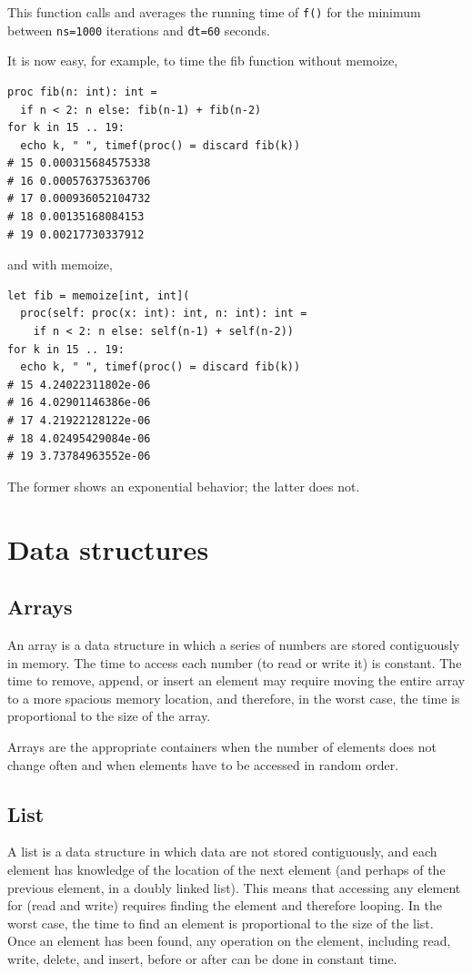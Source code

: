 \documentclass[justified, sixbynine]{tufte-book}
\def\ft{\small\tt}
\theoremstyle{plain}%
\newtheorem * {corollary}{Corollary}
\theoremstyle{definition}
\theoremstyle{remark}
\newtheorem * {remark}{Remark}
\newtheorem * {note}{Note}
\begin{document}
\begin{fullwidth}
This function calls and averages the running time of {\ft f()} for the minimum between {\ft ns=1000} iterations and {\ft dt=60} seconds.

It is now easy, for example, to time the fib function without memoize,
\begin{lstlisting}
proc fib(n: int): int =
  if n < 2: n else: fib(n-1) + fib(n-2)
for k in 15 .. 19:
  echo k, " ", timef(proc() = discard fib(k))
# 15 0.000315684575338
# 16 0.000576375363706
# 17 0.000936052104732
# 18 0.00135168084153
# 19 0.00217730337912
\end{lstlisting}
and with memoize,
\begin{lstlisting}
let fib = memoize[int, int](
  proc(self: proc(x: int): int, n: int): int =
    if n < 2: n else: self(n-1) + self(n-2))
for k in 15 .. 19:
  echo k, " ", timef(proc() = discard fib(k))
# 15 4.24022311802e-06
# 16 4.02901146386e-06
# 17 4.21922128122e-06
# 18 4.02495429084e-06
# 19 3.73784963552e-06
\end{lstlisting}

The former shows an exponential behavior; the latter does not.

\goodbreak\section{Data structures}

\goodbreak\subsection{Arrays}

An array is a data structure in which a series of numbers are stored contiguously in memory. The time to access each number (to read or write it) is constant. The time to remove, append, or insert an element may require moving the entire array to a more spacious memory location, and therefore, in the worst case, the time is proportional to the size of the array.

Arrays are the appropriate containers when the number of elements does not change often and when elements have to be accessed in random order.

\goodbreak\subsection{List}

A list is a data structure in which data are not stored contiguously, and each element has knowledge of the location of the next element (and perhaps of the previous element, in a doubly linked list). This means that accessing any element for (read and write) requires finding the element and therefore looping. In the worst case, the time to find an element is proportional to the size of the list. Once an element has been found, any operation on the element, including read, write, delete, and insert, before or after can be done in constant time.


\end{fullwidth}
\end{document}
